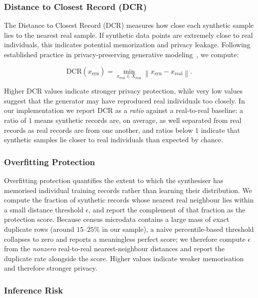 \documentclass[11pt]{article}
\begin{document}
\subsubsection{Distance to Closest Record (DCR)}

The Distance to Closest Record (DCR) measures how close each synthetic sample lies to the nearest real sample. If synthetic data points are extremely close to real individuals, this indicates potential memorization and privacy leakage. Following established practice in privacy-preserving generative modeling~\cite{stadler2022synthetic}, we compute:

\begin{equation}
\text{DCR}(x_{\text{syn}}) = 
\min_{x_{\text{real}} \in X_{\text{real}}}
\left\| x_{\text{syn}} - x_{\text{real}} \right\|.
\end{equation}

Higher DCR values indicate stronger privacy protection, while very low values suggest that the generator may have reproduced real individuals too closely. In our implementation we report DCR as a \emph{ratio} against a real-to-real baseline: a ratio of $1$ means synthetic records are, on average, as well separated from real records as real records are from one another, and ratios below $1$ indicate that synthetic samples lie closer to real individuals than expected by chance.

\subsubsection{Overfitting Protection}

Overfitting protection quantifies the extent to which the synthesiser has memorised individual training records rather than learning their distribution. We compute the fraction of synthetic records whose nearest real neighbour lies within a small distance threshold $\epsilon$, and report the complement of that fraction as the protection score. Because census microdata contains a large mass of exact duplicate rows (around $15$--$25\%$ in our sample), a naive percentile-based threshold collapses to zero and reports a meaningless perfect score; we therefore compute $\epsilon$ from the \emph{nonzero} real-to-real nearest-neighbour distances and report the duplicate rate alongside the score. Higher values indicate weaker memorisation and therefore stronger privacy.

\subsubsection{Inference Risk}
\end{document}
